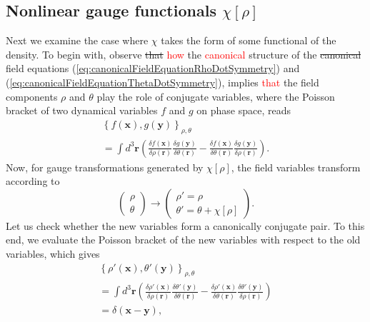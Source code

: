 \documentclass[twocolumn, nofootinbib, nobibnotes, amsmath,amssymb,aps, pra, floatfix]{revtex4-1}
\renewcommand{\v}[1]{\ensuremath{\mathbf{#1}}} %
\begin{document}
\subsection{\label{sec:nonlinearGaugeFunctionals}Nonlinear gauge functionals $\chi\left[\rho\right]$}
Next we examine the case where $\chi$ takes the form of some functional of the density.
To begin with, observe \sout{that} \textcolor{red}{how} the \textcolor{red}{canonical} structure of the \sout{canonical} field equations (\ref{eq:canonicalFieldEquationRhoDotSymmetry}) and (\ref{eq:canonicalFieldEquationThetaDotSymmetry}), implies \textcolor{red}{that} the field components $\rho$ and $\theta$ play the role of conjugate variables, where the Poisson bracket of two dynamical variables $f$ and $g$ on phase space, reads
\begin{multline}
    \left\{ f\left( \v{x} \right),g\left( \v{y} \right) \right\}_{\rho,\theta}\\
    =\int d^3\v{r}\left( \frac{\delta f\left( \v{x} \right)}{\delta\rho\left( \v{r} \right)}\frac{\delta g\left( \v{y} \right)}{\delta\theta\left( \v{r} \right)}-\frac{\delta f\left( \v{x} \right)}{\delta\theta\left( \v{r} \right)}\frac{\delta g\left( \v{y} \right)}{\delta\rho\left( \v{r} \right)} \right).
  \label{eq:poissonBracketReducedPhaseSpace}
\end{multline}
Now, for gauge transformations generated by $\chi\left[\rho\right]$, the field variables transform according to
\begin{equation}
  \begin{pmatrix}
    \rho \\ \theta
  \end{pmatrix}
  \rightarrow
  \begin{pmatrix}
    \rho'=\rho \\ \theta'=\theta+\chi\left[ \rho \right]
  \end{pmatrix}.
  \label{}
\end{equation}
Let us check whether the new variables form a canonically conjugate pair.
To this end, we evaluate the Poisson bracket of the new variables with respect to the old variables, which gives
\begin{multline}
  \left\{ \rho'\left( \v{x}\right), \theta'\left( \v{y}  \right) \right\}_{\rho,\theta}\\
  =\int d^3\v{r}\left( \frac{\delta\rho'\left( \v{x} \right)}{\delta\rho\left( \v{r} \right)}\frac{\delta\theta'\left( \v{y} \right)}{\delta\theta\left( \v{r} \right)}-\frac{\delta\rho'\left( \v{x} \right)}{\delta\theta\left( \v{r} \right)}\frac{\delta\theta'\left( \v{y} \right)}{\delta\rho\left( \v{r} \right)} \right)\\
  =\delta\left( \v{x}-\v{y} \right),
  \label{}
\end{multline}
\end{document}
